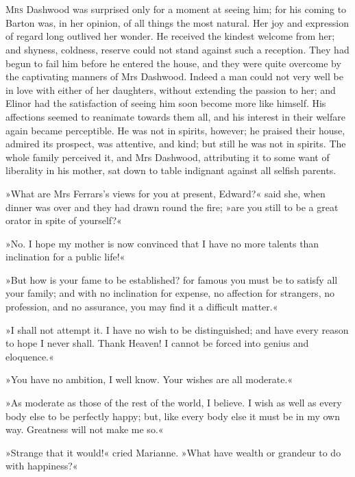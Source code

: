 \chapter[Chapter \thechapter]{}
\lettrine[lines=4,lraise=0.3]{M}{rs} Dashwood was surprised only for a moment at seeing him; for his coming to Barton was, in her opinion, of all things the most natural. Her joy and expression of regard long outlived her wonder. He received the kindest welcome from her; and shyness, coldness, reserve could not stand against such a reception. They had begun to fail him before he entered the house, and they were quite overcome by the captivating manners of Mrs Dashwood. Indeed a man could not very well be in love with either of her daughters, without extending the passion to her; and Elinor had the satisfaction of seeing him soon become more like himself. His affections seemed to reanimate towards them all, and his interest in their welfare again became perceptible. He was not in spirits, however; he praised their house, admired its prospect, was attentive, and kind; but still he was not in spirits. The whole family perceived it, and Mrs Dashwood, attributing it to some want of liberality in his mother, sat down to table indignant against all selfish parents.

»What are Mrs Ferrars’s views for you at present, Edward?« said she, when dinner was over and they had drawn round the fire; »are you still to be a great orator in spite of yourself?«

»No. I hope my mother is now convinced that I have no more talents than inclination for a public life!«

»But how is your fame to be established? for famous you must be to satisfy all your family; and with no inclination for expense, no affection for strangers, no profession, and no assurance, you may find it a difficult matter.«

»I shall not attempt it. I have no wish to be distinguished; and have every reason to hope I never shall. Thank Heaven! I cannot be forced into genius and eloquence.«

»You have no ambition, I well know. Your wishes are all moderate.«

»As moderate as those of the rest of the world, I believe. I wish as well as every body else to be perfectly happy; but, like every body else it must be in my own way. Greatness will not make me so.«

»Strange that it would!« cried Marianne. »What have wealth or grandeur to do with happiness?«

